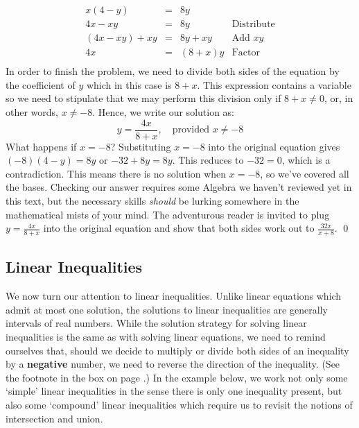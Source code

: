 \documentclass{ximera}
\begin{document}
\begin{example}
\begin{enumerate}
\[\begin{array}{rclr}
x(4-y) & = & 8y & \\

4x - xy & = & 8y & \text{Distribute} \\

(4x - xy) + xy & = & 8y + xy & \text{Add $xy$} \\

4x & = & (8+x)y & \text{Factor} \\ \end{array}\]In order to finish the problem, we need to divide both sides of the equation by the coefficient of $y$ which in this case is $8+x$.  This expression contains a variable so we need to stipulate that we may perform this division only if $8 + x \neq 0$, or, in other words, $x \neq -8$.  Hence, we write our solution as:\[ y =  \frac{4x}{8+x}, \quad \text{provided $x \neq -8$}\] What happens if $x = -8$?  Substituting $x = -8$ into the original equation gives $(-8)(4-y) = 8y$ or $-32 + 8y = 8y$.  This reduces to $-32 = 0$, which is a contradiction.  This means there is no solution when $x = -8$, so we've covered all the bases.  Checking our answer requires some Algebra we haven't reviewed yet in this text, but the necessary skills \emph{should} be lurking somewhere in the mathematical mists of your mind.  The adventurous reader is invited to plug $y = \frac{4x}{8 + x}$ into the original equation and show that both sides work out to $\frac{32x}{x + 8}$. \qed

\end{enumerate}

\end{example}

\subsection{Linear Inequalities}
\label{LinearInequal}

We now turn our attention to linear inequalities.  Unlike linear equations which admit at most one solution, the solutions to linear inequalities are generally intervals of real numbers.  While the solution strategy for solving linear inequalities is the same as with solving linear equations, we need to remind ourselves that, should we decide to multiply or divide both sides of an inequality by a \textbf{negative} number, we need to reverse the direction of the inequality. (See the footnote in the box on page \pageref{equivalenteqnineq}.)  In the example below, we work not only some `simple' linear inequalities in the sense there is only one inequality present, but also some `compound' linear inequalities which require us to revisit the notions of intersection and union. 
\end{document}
